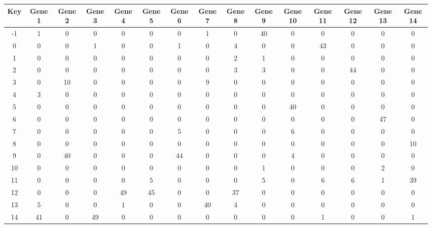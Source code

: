 \begin{tabular}{|c|c|c|c|c|c|c|c|c|c|c|c|c|c|c|}
\hline
Key & Gene 1 & Gene 2 & Gene 3 & Gene 4 & Gene 5 & Gene 6 & Gene 7 & Gene 8 & Gene 9 & Gene 10 & Gene 11 & Gene 12 & Gene 13 & Gene 14 \\
\hline
-1 & 1 & 0 & 0 & 0 & 0 & 0 & 1 & 0 & 40 & 0 & 0 & 0 & 0 & 0 \\
0 & 0 & 0 & 1 & 0 & 0 & 1 & 0 & 4 & 0 & 0 & 43 & 0 & 0 & 0 \\
1 & 0 & 0 & 0 & 0 & 0 & 0 & 0 & 2 & 1 & 0 & 0 & 0 & 0 & 0 \\
2 & 0 & 0 & 0 & 0 & 0 & 0 & 0 & 3 & 3 & 0 & 0 & 44 & 0 & 0 \\
3 & 0 & 10 & 0 & 0 & 0 & 0 & 9 & 0 & 0 & 0 & 0 & 0 & 0 & 0 \\
4 & 3 & 0 & 0 & 0 & 0 & 0 & 0 & 0 & 0 & 0 & 0 & 0 & 0 & 0 \\
5 & 0 & 0 & 0 & 0 & 0 & 0 & 0 & 0 & 0 & 40 & 0 & 0 & 0 & 0 \\
6 & 0 & 0 & 0 & 0 & 0 & 0 & 0 & 0 & 0 & 0 & 0 & 0 & 47 & 0 \\
7 & 0 & 0 & 0 & 0 & 0 & 5 & 0 & 0 & 0 & 6 & 0 & 0 & 0 & 0 \\
8 & 0 & 0 & 0 & 0 & 0 & 0 & 0 & 0 & 0 & 0 & 0 & 0 & 0 & 10 \\
9 & 0 & 40 & 0 & 0 & 0 & 44 & 0 & 0 & 0 & 4 & 0 & 0 & 0 & 0 \\
10 & 0 & 0 & 0 & 0 & 0 & 0 & 0 & 0 & 1 & 0 & 0 & 0 & 2 & 0 \\
11 & 0 & 0 & 0 & 0 & 5 & 0 & 0 & 0 & 5 & 0 & 6 & 6 & 1 & 39 \\
12 & 0 & 0 & 0 & 49 & 45 & 0 & 0 & 37 & 0 & 0 & 0 & 0 & 0 & 0 \\
13 & 5 & 0 & 0 & 1 & 0 & 0 & 40 & 4 & 0 & 0 & 0 & 0 & 0 & 0 \\
14 & 41 & 0 & 49 & 0 & 0 & 0 & 0 & 0 & 0 & 0 & 1 & 0 & 0 & 1 \\
\hline
\end{tabular}